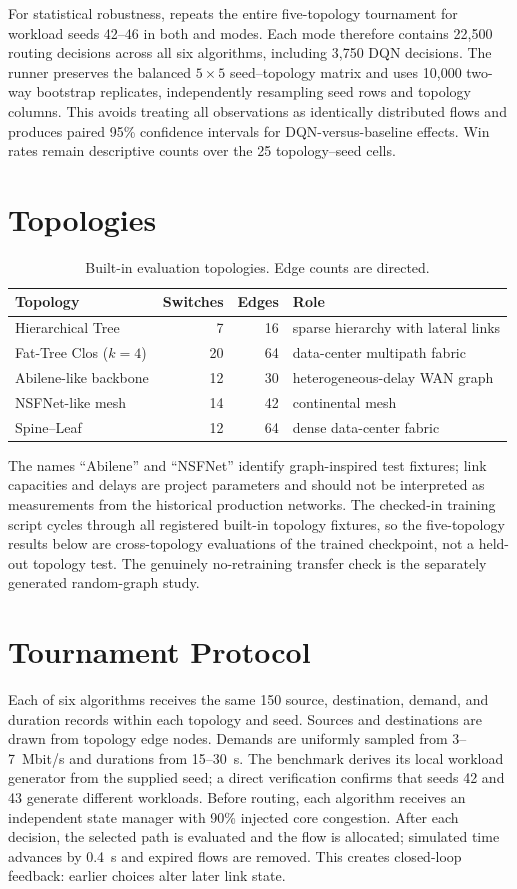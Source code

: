 \documentclass[12pt,a4paper,oneside]{report}
\newcommand{\code}[1]{\texttt{\seqsplit{#1}}}
\begin{document}
For statistical robustness, \code{evaluate\_multiseed.py} repeats the entire five-topology tournament for workload seeds 42--46 in both \code{pure} and \code{safety} modes. Each mode therefore contains 22,500 routing decisions across all six algorithms, including 3,750 DQN decisions. The runner preserves the balanced $5\times5$ seed--topology matrix and uses 10,000 two-way bootstrap replicates, independently resampling seed rows and topology columns. This avoids treating all observations as identically distributed flows and produces paired 95\% confidence intervals for DQN-versus-baseline effects. Win rates remain descriptive counts over the 25 topology--seed cells.

\section{Topologies}
\begin{table}[htbp]
\centering
\caption{Built-in evaluation topologies. Edge counts are directed.}
\label{tab:topologies}
\begin{tabular}{lrrl}
\toprule
\textbf{Topology} & \textbf{Switches} & \textbf{Edges} & \textbf{Role}\\
\midrule
Hierarchical Tree & 7 & 16 & sparse hierarchy with lateral links\\
Fat-Tree Clos ($k=4$) & 20 & 64 & data-center multipath fabric\\
Abilene-like backbone & 12 & 30 & heterogeneous-delay WAN graph\\
NSFNet-like mesh & 14 & 42 & continental mesh\\
Spine--Leaf & 12 & 64 & dense data-center fabric\\
\bottomrule
\end{tabular}
\end{table}
The names ``Abilene'' and ``NSFNet'' identify graph-inspired test fixtures; link capacities and delays are project parameters and should not be interpreted as measurements from the historical production networks. The checked-in training script cycles through all registered built-in topology fixtures, so the five-topology results below are cross-topology evaluations of the trained checkpoint, not a held-out topology test. The genuinely no-retraining transfer check is the separately generated random-graph study.

\section{Tournament Protocol}
Each of six algorithms receives the same 150 source, destination, demand, and duration records within each topology and seed. Sources and destinations are drawn from topology edge nodes. Demands are uniformly sampled from 3--7~Mbit/s and durations from 15--30~s. The benchmark derives its local workload generator from the supplied seed; a direct verification confirms that seeds 42 and 43 generate different workloads. Before routing, each algorithm receives an independent state manager with 90\% injected core congestion. After each decision, the selected path is evaluated and the flow is allocated; simulated time advances by 0.4~s and expired flows are removed. This creates closed-loop feedback: earlier choices alter later link state.
\end{document}
